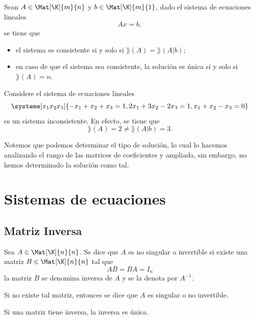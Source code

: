 \documentclass[compacto,10pt]{pubciencias-notas}
\begin{document}
\begin{teo}\label{Sem03TeoR-F}
    Sean $A\in \Mat[\K]{m}{n}$ y $b\in \Mat[\K]{m}{1}$, dado el sistema de ecuaciones lineales
    \[
        Ax=b,
    \]
    se tiene que
    \begin{itemize}
    \item
        el sistema es consistente si y solo si $\rang(A)=\rang(A|b)$;
    \item
        en caso de que el sistema sea consistente, la solución es única si y solo si $\rang(A)=n$.
    \end{itemize}
\end{teo}

\begin{ejem}\hspace{0pt} 
Considere el sistema de ecuaciones lineales
\[
    \systeme[x_1 x_2 x_3]{-x_1 +x_2 +x_3 = 1,
        2x_1 +3x_2 -2x_3 = 1,
        x_1 +x_2 -x_3 = 0}
\]
es un sistema inconsistente. En efecto, se tiene que 
\[
    \rang(A) = 2 \neq \rang(A|b) = 3.
\]
\end{ejem}

\begin{obs} Notemos que podemos determinar el tipo de solución, lo cual lo hacemos analizando el rango de las matrices de coeficientes y ampliada, sin embargo, no hemos determinado la solución como tal.
\end{obs}

\setcounter{section}{1}
\section{Sistemas de ecuaciones}
\setcounter{subsection}{2}
\subsection{Matriz Inversa}

\begin{defi}\label{Sem03Clas02DefInv}
    Sea $A\in \Mat[\K]{n}{n}$. Se dice que $A$ es no singular o invertible si existe una matriz $B\in \Mat[\K]{n}{n}$ tal que 
    \[
        AB = BA = I_n
    \]
    la matriz $B$ se denomina inversa de $A$ y se la denota por $A^{-1}$. 
    
    \noindent Si no existe tal matriz, entonces se dice que $A$ es singular o no invertible. 
\end{defi}

\begin{prop}
    Si una matriz tiene inversa, la inversa es única. 
\end{prop}
\end{document}
